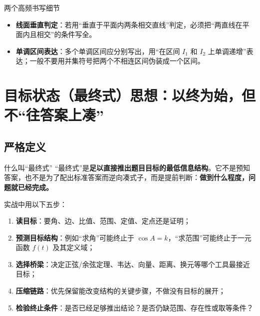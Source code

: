\documentclass[11pt,a4paper]{ctexart}
\begin{document}
\begin{theorembox}{两个高频书写细节}
\begin{itemize}
  \item \textbf{线面垂直判定}：若用“垂直于平面内两条相交直线”判定，必须把“两直线在平面内且相交”的条件写全。
  \item \textbf{单调区间表达}：多个单调区间应分别写出，用“在区间 $I_1$ 和 $I_2$ 上单调递增”表达；一般不要用并集符号把两个不相连区间伪装成一个区间。
\end{itemize}
\end{theorembox}

\newpage

\section{目标状态（最终式）思想：以终为始，但不“往答案上凑”}

\subsection{严格定义}
\begin{keybox}{什么叫“最终式”}
“最终式”是\textbf{足以直接推出题目目标的最低信息结构}。它不是预知答案，也不是为了配出标准答案而逆向凑式子，而是提前判断：\textbf{做到什么程度，问题就已经完成。}
\end{keybox}

实战中用以下五步：
\begin{enumerate}
  \item \textbf{读目标}：要角、边、比值、范围、定值、定点还是证明；
  \item \textbf{预测目标结构}：例如“求角”可能终止于 $\cos A=k$，“求范围”可能终止于一元函数 $f(t)$ 及其定义域；
  \item \textbf{选择桥梁}：决定正弦/余弦定理、韦达、向量、距离、换元等哪个工具最接近目标；
  \item \textbf{压缩链路}：优先保留能改变结构的关键步骤，不做没有目标的展开；
  \item \textbf{检验终止条件}：是否已经足够推出结论？是否仍缺范围、存在性或取等条件？
\end{enumerate}
\end{document}
